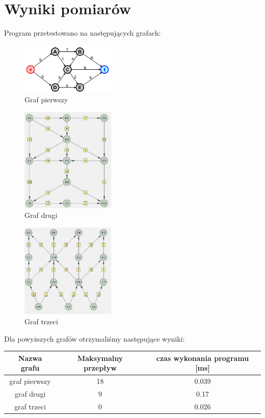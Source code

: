 \documentclass[a4paper,11pt]{article}
\begin{document}
\section{Wyniki pomiarów}
    Program przetestowano na następujących grafach:
    \begin{figure}[H]
        \centering
            \includegraphics[width=0.4\textwidth]{in1}
            \caption{Graf pierwszy}
    \end{figure}
    \begin{figure}[H]
        \centering
            \includegraphics[width=0.4\textwidth]{in2}
            \caption{Graf drugi}
    \end{figure}
    \begin{figure}[H]
        \centering
            \includegraphics[width=0.4\textwidth]{in3}
            \caption{Graf trzeci}
    \end{figure}
    \newpage
    Dla powyższych grafów otrzymaliśmy następujące wyniki: \\[0.3cm]
    \begin{tabular}{c|c|c}
        Nazwa grafu & Maksymalny przepływ & czas wykonania programu [ms] \\ \hline
        graf pierwszy & 18 & 0.039 \\
        graf drugi & 9 & 0.17 \\
        graf trzeci & 0 & 0.026 \\ \hline
    \end{tabular}
\end{document}
